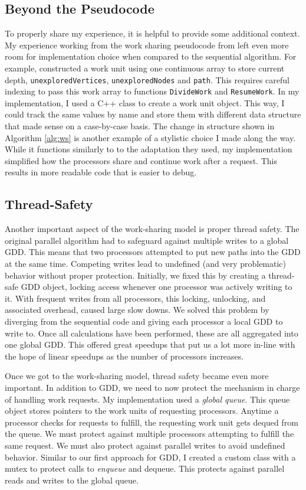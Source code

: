 \documentclass[12pt,twoside]{reedthesis}
\begin{document}
\subsection{Beyond the Pseudocode}
To properly share my experience, it is helpful to provide some additional context. My experience working from the work sharing pseudocode from \citeauthor{par_t} \cite{par_t} left even more room for implementation choice when compared to the sequential algorithm. For example, \citeauthor{par_t} \cite{par_t} constructed a work unit using one continuous array to store current depth, \texttt{unexploredVertices}, \texttt{unexploredNodes} and \texttt{path}. This requires careful indexing to pass  this work array to functions \texttt{DivideWork} and \texttt{ResumeWork}. In my implementation, I used a C++ class to create a work unit object. This way, I could track the same values by name and store them with different data structure that made sense on a case-by-case basis. The change in structure shown in Algorithm \ref{alg:ws} is another example of a stylistic choice I made along the way. While it functions similarly to to the adaptation they used, my implementation simplified how the processors share and continue work after a request. This results in more readable code that is easier to debug.


\subsection{Thread-Safety}
Another important aspect of the work-sharing model is proper thread safety. The original parallel algorithm had to safeguard against multiple writes to a global GDD. This means that two processors attempted to put new paths into the GDD at the same time. Competing writes lead to undefined (and very problematic) behavior without proper protection. Initially, we fixed this by creating a thread-safe GDD object, locking access whenever one processor was actively writing to it. With frequent writes from all processors, this locking, unlocking, and associated overhead, caused large slow downs. We solved this problem by diverging from the sequential code and giving each processor a local GDD to write to. Once all calculations have been performed, these are all aggregated into one global GDD. This offered great speedups that put us a lot more in-line with the hope of linear speedups as the number of processors increases.

Once we got to the work-sharing model, thread safety became even more important. In addition to GDD, we need to now protect the mechanism in charge of handling work requests. My implementation used a \textit{global queue}. This queue object stores pointers to the work units of requesting processors. Anytime a processor checks for requests to fulfill, the requesting work unit gets dequed from the queue. We must protect against multiple processors attempting to fulfill the same request. We must also protect against parallel writes to avoid undefined behavior. Similar to our first approach for GDD, I created a custom class with a mutex to protect calls to \textit{enqueue} and {dequeue}. This protects against parallel reads and writes to the global queue.
\end{document}
